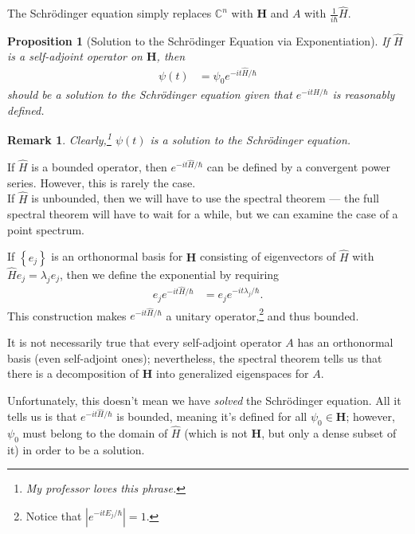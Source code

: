 \documentclass[12pt]{extarticle}
\newtheorem*{remark}{Remark}
\newcommand{\C}{\mathbb{C}}
\newcommand{\set}[1]{\left\{#1\right\}}
\theoremstyle{plain}
\newtheorem*{proposition}{Proposition}%
\theoremstyle{definition}
\theoremstyle{remark}
\renewcommand{\newline}{\hfill\break}
\begin{document}
  The Schrödinger equation simply replaces $\C^{n}$ with $\mathbf{H}$ and $A$ with $\frac{1}{i\hbar}\hat{H}$.
  \begin{proposition}[Solution to the Schrödinger Equation via Exponentiation]
    If $\hat{H}$ is a self-adjoint operator on $\mathbf{H}$, then
    \begin{align*}
      \psi(t) &= \psi_0 e^{-it\hat{H}/\hbar}
    \end{align*}
    should be a solution to the Schrödinger equation given that $e^{-it\hat{H}/\hbar}$ is reasonably defined.
  \end{proposition}
  \begin{remark}
    Clearly,\footnote{My professor loves this phrase.} $\psi(t)$ is a solution to the Schrödinger equation.
  \end{remark}
  If $\hat{H}$ is a bounded operator, then $e^{-it\hat{H}/\hbar}$ can be defined by a convergent power series. However, this is rarely the case.\\

  If $\hat{H}$ is unbounded, then we will have to use the spectral theorem --- the full spectral theorem will have to wait for a while, but we can examine the case of a point spectrum.\newline

  If $\set{e_j}$ is an orthonormal basis for $\mathbf{H}$ consisting of eigenvectors of $\hat{H}$ with $\hat{H}e_j = \lambda_je_j$, then we define the exponential by requiring
  \begin{align*}
    e_je^{-it\hat{H}/\hbar} &= e_je^{-it\lambda_j/\hbar}.
  \end{align*}
  This construction makes $e^{-it\hat{H}/\hbar}$ a unitary operator,\footnote{Notice that $\left|e^{-itE_j/\hbar}\right| = 1$.} and thus bounded.\newline

  It is not necessarily true that every self-adjoint operator $A$ has an orthonormal basis (even self-adjoint ones); nevertheless, the spectral theorem tells us that there is a decomposition of $\mathbf{H}$ into generalized eigenspaces for $A$.\newline

  Unfortunately, this doesn't mean we have \textit{solved} the Schrödinger equation. All it tells us is that $e^{-it\hat{H}/\hbar}$ is bounded, meaning it's defined for all $\psi_0 \in \mathbf{H}$; however, $\psi_0$ must belong to the domain of $\hat{H}$ (which is not $\mathbf{H}$, but only a dense subset of it) in order to be a solution.\newline
\end{document}
